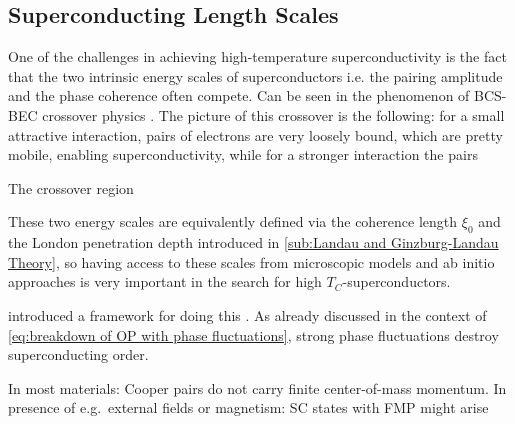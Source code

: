 \documentclass[../notes.tex]{subfiles}
\begin{document}
\subsection*{Superconducting Length Scales}


One of the challenges in achieving high-temperature superconductivity is the fact that the two intrinsic energy scales of superconductors i.e. the pairing amplitude and the phase coherence often compete.
Can be seen in the phenomenon of BCS-BEC crossover physics \cite{chenWhenSuperconductivityCrosses2024}.
The picture of this crossover is the following: for a small attractive interaction, pairs of electrons are very loosely bound, which are pretty mobile, enabling superconductivity, while for a stronger interaction the pairs

The crossover region


These two energy scales are equivalently defined via the coherence length \(\xi_0\) and the London penetration depth introduced in \cref{sub:Landau and Ginzburg-Landau Theory}, so having access to these scales from microscopic models and ab initio approaches is very important in the search for high \(T_C\)-superconductors.

\citeauthor{wittBypassingLatticeBCS2024} introduced a framework for doing this \cite{wittBypassingLatticeBCS2024}.
As already discussed in the context of \cref{eq:breakdown of OP with phase fluctuations}, strong phase fluctuations destroy superconducting order.

In most materials: Cooper pairs do not carry finite center-of-mass momentum.
In presence of e.g.\ external fields or magnetism: SC states with FMP might arise \cite{chenFiniteMomentumCooper2018, wanOrbitalFuldeFerrell2023, yuanSupercurrentDiodeEffect2022}

\end{document}
